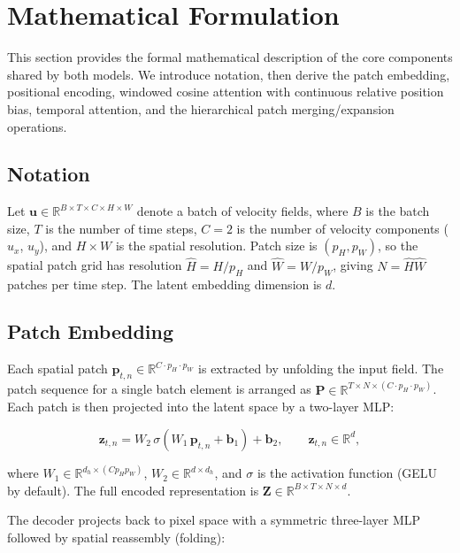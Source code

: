 \section{Mathematical Formulation}

This section provides the formal mathematical description of the core components shared by both models. We introduce notation, then derive the patch embedding, positional encoding, windowed cosine attention with continuous relative position bias, temporal attention, and the hierarchical patch merging/expansion operations.

\subsection{Notation}

Let $\mathbf{u} \in \mathbb{R}^{B \times T \times C \times H \times W}$ denote a batch of velocity fields, where $B$ is the batch size, $T$ is the number of time steps, $C=2$ is the number of velocity components ($u_x$, $u_y$), and $H \times W$ is the spatial resolution. Patch size is $(p_H, p_W)$, so the spatial patch grid has resolution $\hat{H} = H/p_H$ and $\hat{W} = W/p_W$, giving $N = \hat{H}\hat{W}$ patches per time step. The latent embedding dimension is $d$.

\subsection{Patch Embedding}

Each spatial patch $\mathbf{p}_{t,n} \in \mathbb{R}^{C \cdot p_H \cdot p_W}$ is extracted by unfolding the input field. The patch sequence for a single batch element is arranged as $\mathbf{P} \in \mathbb{R}^{T \times N \times (C \cdot p_H \cdot p_W)}$. Each patch is then projected into the latent space by a two-layer MLP:

\begin{equation}
    \mathbf{z}_{t,n} = W_2 \, \sigma\!\left(W_1 \, \mathbf{p}_{t,n} + \mathbf{b}_1\right) + \mathbf{b}_2,
    \qquad
    \mathbf{z}_{t,n} \in \mathbb{R}^{d},
\end{equation}

where $W_1 \in \mathbb{R}^{d_h \times (C p_H p_W)}$, $W_2 \in \mathbb{R}^{d \times d_h}$, and $\sigma$ is the activation function (GELU by default). The full encoded representation is $\mathbf{Z} \in \mathbb{R}^{B \times T \times N \times d}$.

The decoder projects back to pixel space with a symmetric three-layer MLP followed by spatial reassembly (folding):

